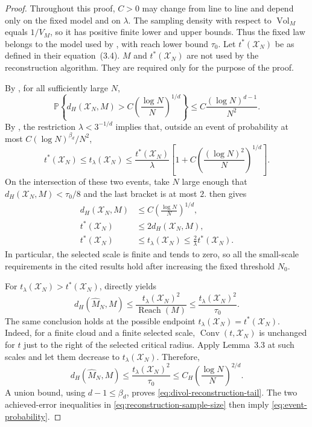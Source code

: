 \documentclass{article}
\newcommand{\Pp}{\mathbb P}
\newcommand{\Vol}{\operatorname{Vol}}
\newcommand{\Reach}{\operatorname{Reach}}
\newcommand{\wideM}{\widehat M_N}
\numberwithin{equation}{section}
\begin{document}
\begin{proof}
Throughout this proof, $C>0$ may change from line to line and depend only
on the fixed model and on $\lambda$.
The sampling density with respect to $\Vol_M$ equals $1/V_M$, so it has
positive finite lower and upper bounds. Thus the fixed
law belongs to the model used by \citet{divol2021}, with reach lower bound
$\tau_0$. Let $t^*(\mathcal X_N)$ be as defined in their equation~(3.4).
$M$ and $t^*(\mathcal X_N)$ are not used by the
reconstruction algorithm. They are required only for the purpose of the proof.

By \citet[Proposition~3.9, with parameter $a=3$]{divol2021}, for all
sufficiently large $N$,
\[
 \Pp\left\{
 d_H(\mathcal X_N,M)>C\left(\frac{\log N}{N}\right)^{1/d}
 \right\}
 \le C\frac{(\log N)^{d-1}}{N^2}.
\]
By \citet[Theorem~4.6(1), with $b=2$]{divol2021}, the restriction
$\lambda<3^{-1/d}$ implies that, outside an event of probability at most
$C(\log N)^{\beta_d}/N^2$,
\[
 t^*(\mathcal X_N)
 \le t_\lambda(\mathcal X_N)
 \le\frac{t^*(\mathcal X_N)}{\lambda}
 \left[
  1+C\left(\frac{(\log N)^2}{N}\right)^{1/d}
 \right].
\]
On the intersection of these two events, take $N$ large enough that
$d_H(\mathcal X_N,M)<\tau_0/8$ and the last bracket is at most $2$.
\citet[Proposition~3.4]{divol2021} then gives
\[
 \begin{aligned}
 d_H(\mathcal X_N,M)
 &\le C\left(\frac{\log N}{N}\right)^{1/d},\\
 t^*(\mathcal X_N)
 &\le2d_H(\mathcal X_N,M),\\
 t^*(\mathcal X_N)
 &\le t_\lambda(\mathcal X_N)
 \le\frac{2}{\lambda}t^*(\mathcal X_N).
 \end{aligned}
\]
In particular, the selected scale is finite and tends to zero, so all the
small-scale requirements in the cited results hold after increasing the
fixed threshold $N_0$.

For $t_\lambda(\mathcal X_N)>t^*(\mathcal X_N)$,
\citet[Lemma~3.3]{divol2021} directly yields
\[
 d_H(\wideM,M)
 \le\frac{t_\lambda(\mathcal X_N)^2}{\Reach(M)}
 \le\frac{t_\lambda(\mathcal X_N)^2}{\tau_0}.
\]
The same conclusion holds at the possible endpoint
$t_\lambda(\mathcal X_N)=t^*(\mathcal X_N)$. Indeed, for a finite cloud and
a finite selected scale, $\operatorname{Conv}(t,\mathcal X_N)$ is unchanged
for $t$ just to the right of the selected critical radius. Apply
Lemma~3.3 at such scales and let them decrease to
$t_\lambda(\mathcal X_N)$. Therefore,
\[
 d_H(\wideM,M)
 \le\frac{t_\lambda(\mathcal X_N)^2}{\tau_0}
 \le C_H\left(\frac{\log N}{N}\right)^{2/d}.
\]
A union bound, using $d-1\le\beta_d$, proves
\eqref{eq:divol-reconstruction-tail}. The two achieved-error inequalities
in \eqref{eq:reconstruction-sample-size} then imply
\eqref{eq:event-probability}.
\end{proof}
\end{document}
